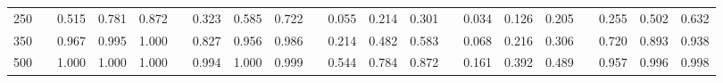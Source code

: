 % 
\begin{tabular}{ccccccccccccccccccccc}
  \hline
  \hline
250 &  & 0.515 & 0.781 & 0.872 &  & 0.323 & 0.585 & 0.722 &  & 0.055 & 0.214 & 0.301 &  & 0.034 & 0.126 & 0.205 &  & 0.255 & 0.502 & 0.632 \\ 
  350 &  & 0.967 & 0.995 & 1.000 &  & 0.827 & 0.956 & 0.986 &  & 0.214 & 0.482 & 0.583 &  & 0.068 & 0.216 & 0.306 &  & 0.720 & 0.893 & 0.938 \\ 
  500 &  & 1.000 & 1.000 & 1.000 &  & 0.994 & 1.000 & 0.999 &  & 0.544 & 0.784 & 0.872 &  & 0.161 & 0.392 & 0.489 &  & 0.957 & 0.996 & 0.998 \\ 
   \hline
\end{tabular}
